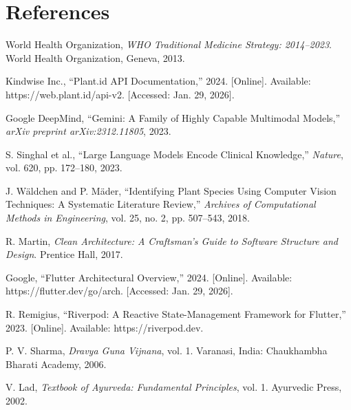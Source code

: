 \chapter*{References}

\begin{enumerate}[leftmargin=*, label={[\arabic*]}]
    \item World Health Organization, \textit{WHO Traditional Medicine Strategy: 2014--2023}.
    World Health Organization, Geneva, 2013.

    \item Kindwise Inc., ``Plant.id API Documentation,'' 2024. [Online]. Available:
    https://web.plant.id/api-v2. [Accessed: Jan. 29, 2026].

    \item Google DeepMind, ``Gemini: A Family of Highly Capable Multimodal Models,''
    \textit{arXiv preprint arXiv:2312.11805}, 2023.

    \item S. Singhal et al., ``Large Language Models Encode Clinical Knowledge,''
    \textit{Nature}, vol. 620, pp. 172--180, 2023.

    \item J. W\"{a}ldchen and P. M\"{a}der, ``Identifying Plant Species Using Computer
    Vision Techniques: A Systematic Literature Review,'' \textit{Archives of Computational
    Methods in Engineering}, vol. 25, no. 2, pp. 507--543, 2018.

    \item R. Martin, \textit{Clean Architecture: A Craftsman's Guide to Software Structure
    and Design}. Prentice Hall, 2017.

    \item Google, ``Flutter Architectural Overview,'' 2024. [Online]. Available:
    https://flutter.dev/go/arch. [Accessed: Jan. 29, 2026].

    \item R. Remigius, ``Riverpod: A Reactive State-Management Framework for Flutter,''
    2023. [Online]. Available: https://riverpod.dev.

    \item P. V. Sharma, \textit{Dravya Guna Vijnana}, vol. 1. Varanasi, India:
    Chaukhambha Bharati Academy, 2006.

    \item V. Lad, \textit{Textbook of Ayurveda: Fundamental Principles}, vol. 1.
    Ayurvedic Press, 2002.


\end{enumerate}
